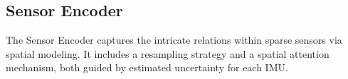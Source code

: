 \documentclass[letterpaper]{article} %
\begin{document}
\subsection{Sensor Encoder}

The Sensor Encoder captures the intricate relations within sparse sensors via spatial modeling. It includes a resampling strategy and a spatial attention mechanism, both guided by estimated uncertainty for each IMU.
\end{document}
